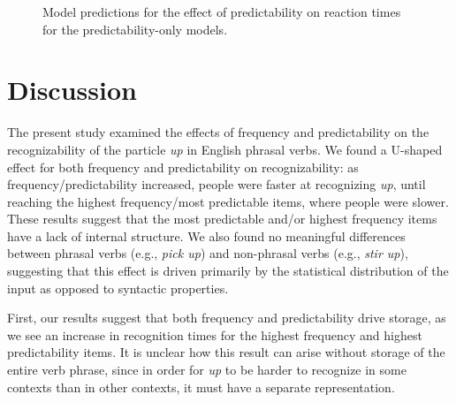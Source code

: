 \documentclass[
  authoryear,
  preprint,
  1p,
  onecolumn]{elsarticle}
\begin{document}
\begin{figure}


\caption{\label{fig-PredicOnlyPlot}Model predictions for the effect of
predictability on reaction times for the predictability-only models.}

\end{figure}%

\section{Discussion}\label{discussion}

The present study examined the effects of frequency and predictability
on the recognizability of the particle \emph{up} in English phrasal
verbs. We found a U-shaped effect for both frequency and predictability
on recognizability: as frequency/predictability increased, people were
faster at recognizing \emph{up}, until reaching the highest
frequency/most predictable items, where people were slower. These
results suggest that the most predictable and/or highest frequency items
have a lack of internal structure. We also found no meaningful
differences between phrasal verbs (e.g., \emph{pick up}) and non-phrasal
verbs (e.g., \emph{stir up}), suggesting that this effect is driven
primarily by the statistical distribution of the input as opposed to
syntactic properties.

First, our results suggest that both frequency and predictability drive
storage, as we see an increase in recognition times for the highest
frequency and highest predictability items. It is unclear how this
result can arise without storage of the entire verb phrase, since in
order for \emph{up} to be harder to recognize in some contexts than in
other contexts, it must have a separate representation.
\end{document}
